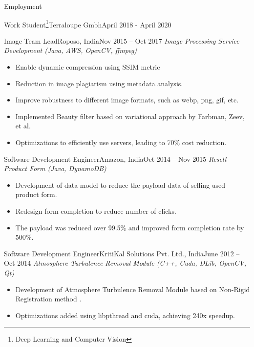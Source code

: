 \documentclass[]{mcdowellcv}
\begin{document}
\begin{cvsection}{Employment}
\begin{cvsubsection}{Work Student\footnote{Deep Learning and Computer Vision\label{ws}}}{Terraloupe Gmbh}{April 2018 - April 2020}
        \end{cvsubsection}
        
        \begin{cvsubsection}{Image Team Lead}{Roposo, India}{Nov 2015 -- Oct 2017}        
        \textit{Image Processing Service Development (Java, AWS, OpenCV, ffmpeg)}
            \begin{itemize}
                \item Enable dynamic compression using SSIM metric
                \item Reduction in image plagiarism using metadata analysis.
                \item Improve robustness to different image formats, such as webp, png, gif, etc.
                \item Implemented Beauty filter based on variational approach by Farbman, Zeev, et al. \cite{farbman2008edge}
                \item Optimizations to efficiently use servers, leading to 70\% cost reduction.
            \end{itemize}
        \end{cvsubsection}
          
        \begin{cvsubsection}{Software Development Engineer}{Amazon, India}{Oct 2014 -- Nov 2015}        
        \textit{Resell Product Form (Java, DynamoDB)}
            \begin{itemize}
                \item Development of data model to reduce the payload data of selling used product form. 
                \item Redesign form completion to reduce number of clicks.
                \item The payload was reduced over 99.5\% and improved form completion rate by 500\%.
            \end{itemize}
        \end{cvsubsection}

        \begin{cvsubsection}{Software Development Engineer}{KritiKal Solutions Pvt. Ltd., India}{June 2012 -- Oct 2014}
            \textit{Atmosphere Turbulence Removal Module (C++, Cuda, DLib, OpenCV, Qt)}
            \begin{itemize}
                \item Development of Atmosphere Turbulence Removal Module based on Non-Rigid Registration method \cite{rueckert1999nonrigid}.
                \item Optimizations added using libpthread and cuda, achieving 240x speedup.
            \end{itemize}
            

\end{cvsubsection}
\end{cvsection}
\end{document}
